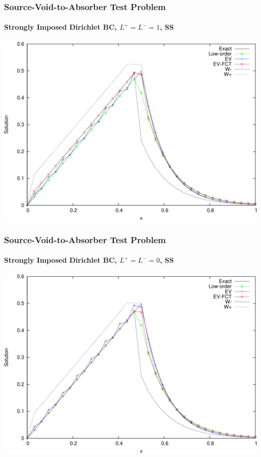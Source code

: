 \begin{frame}
\frametitle{Source-Void-to-Absorber Test Problem}
\framesubtitle{Strongly Imposed Dirichlet BC, $L^+=L^-=1$, SS}

\begin{center}
\includegraphics[height=0.8\textheight]{./figures/sourcevoid_strong1.pdf}
\end{center}

\end{frame}
\begin{frame}
\frametitle{Source-Void-to-Absorber Test Problem}
\framesubtitle{Strongly Imposed Dirichlet BC, $L^+=L^-=0$, SS}

\begin{center}
\includegraphics[height=0.8\textheight]{./figures/sourcevoid_strong0.pdf}
\end{center}

\end{frame}
